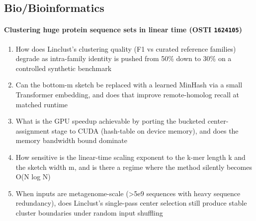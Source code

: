 \subsection*{Bio/Bioinformatics}
\paragraph{Clustering huge protein sequence sets in linear time \textnormal{\small(OSTI \texttt{1624105})}}
\begin{enumerate}[leftmargin=1.6em,itemsep=0.2em,topsep=0.2em,label=Q\arabic*.]
\item How does Linclust's clustering quality (F1 vs curated reference families) degrade as intra-family identity is pushed from 50\% down to 30\% on a controlled synthetic benchmark
\item Can the bottom-m sketch be replaced with a learned MinHash via a small Transformer embedding, and does that improve remote-homolog recall at matched runtime
\item What is the GPU speedup achievable by porting the bucketed center-assignment stage to CUDA (hash-table on device memory), and does the memory bandwidth bound dominate
\item How sensitive is the linear-time scaling exponent to the k-mer length k and the sketch width m, and is there a regime where the method silently becomes O(N log N)
\item When inputs are metagenome-scale (\textgreater{}5e9 sequences with heavy sequence redundancy), does Linclust's single-pass center selection still produce stable cluster boundaries under random input shuffling
\end{enumerate}
